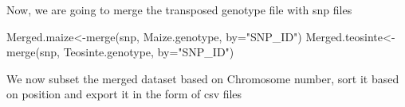 \documentclass[
]{article}
\newenvironment{Shaded}{\begin{snugshade}}{\end{snugshade}}
\newcommand{\AttributeTok}[1]{\textcolor[rgb]{0.77,0.63,0.00}{#1}}
\newcommand{\FunctionTok}[1]{\textcolor[rgb]{0.00,0.00,0.00}{#1}}
\newcommand{\NormalTok}[1]{#1}
\newcommand{\OtherTok}[1]{\textcolor[rgb]{0.56,0.35,0.01}{#1}}
\newcommand{\StringTok}[1]{\textcolor[rgb]{0.31,0.60,0.02}{#1}}
\begin{document}
Now, we are going to merge the transposed genotype file with snp files

\begin{Shaded}
\begin{Highlighting}[]
\NormalTok{Merged.maize}\OtherTok{\textless{}{-}}\FunctionTok{merge}\NormalTok{(snp, Maize.genotype, }\AttributeTok{by=}\StringTok{"SNP\_ID"}\NormalTok{)}
\NormalTok{Merged.teosinte}\OtherTok{\textless{}{-}}\FunctionTok{merge}\NormalTok{(snp, Teosinte.genotype, }\AttributeTok{by=}\StringTok{"SNP\_ID"}\NormalTok{)}
\end{Highlighting}
\end{Shaded}

We now subset the merged dataset based on Chromosome number, sort it
based on position and export it in the form of csv files
\end{document}

